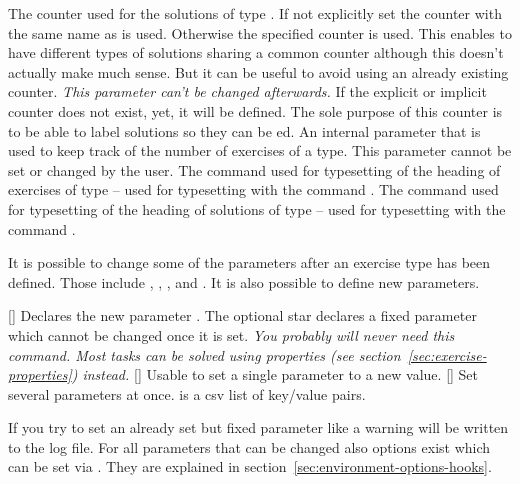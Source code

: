 \documentclass{xsim-manual}
\begin{document}
\begin{parameters}
    The counter used for the solutions of type .  If not explicitly
    set the counter with the same name as  is used.
    Otherwise the specified counter is used.  This enables to have different
    types of solutions sharing a common counter although this doesn't actually
    make much sense.  But it can be useful to avoid using an already existing
    counter. \emph{This parameter can't be changed afterwards.}  If the
    explicit or implicit counter does not exist, yet, it will be defined.  The
    sole purpose of this counter is to be able to label solutions so they can
    be ed.
    An internal parameter that is used to keep track of the number of
    exercises of a type.  This parameter cannot be set or changed by the
    user.
    The command used for typesetting of the heading of
    exercises of type  -- used for typesetting with the command
    .
    The command used for typesetting of the heading of
    solutions of type  -- used for typesetting with the command
    .
\end{parameters}

It is possible to change some of the parameters after an exercise type has
been defined.  Those include ,
, , and
.  It is also possible to define new parameters.
\begin{commands}
  [\sarg{}]
    Declares the new parameter .  The optional star declares a
    fixed parameter which cannot be changed once it is set.  \emph{You
      probably will never need this command.  Most tasks can be solved using
      properties (see section~\vref{sec:exercise-properties}) instead.}
  []
    Usable to set a single parameter to a new value.
  []
    Set several parameters at once.  is a csv list of
    key/value pairs.
\end{commands}
If you try to set an already set but fixed parameter like
 a warning will be written to the log file.  For all
parameters that can be changed also options exist which can be set via
.  They are explained in
section~\vref{sec:environment-options-hooks}.
\end{document}
